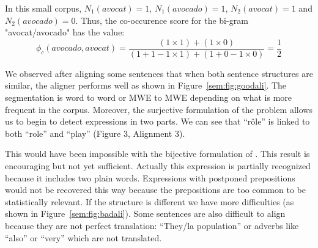 \documentclass[output=paper,modfonts,nonflat]{langsci/langscibook}
\begin{document}
In this small corpus, $N_1(avocat) = 1$, $N_1(avocado) = 1$, $N_2(avocat) = 1$ and $N_2(avocado) = 0$. Thus, the co-occurence score for the bi-gram "avocat/avocado" has the value:
\begin{equation}
\phi_{c}(avocado,avocat) = \frac{(1 \times 1) + (1 \times 0)}{(1 + 1 -1 \times 1) + (1 + 0 - 1 \times 0)} = \frac{1}{2}
\end{equation}

We observed after aligning some sentences that when both sentence structures are similar, the aligner performs well as shown in Figure~\ref{sem:fig:goodali}. The segmentation is word to word or MWE to MWE depending on what is more frequent in the corpus. Moreover, the surjective formulation of the problem allows us to begin to detect expressions in two parts. 
We can see that ``rôle'' is linked to both ``role'' and ``play'' (Figure 3, Alignment 3).

This would have been impossible with the bijective formulation of \citet{denero2008complexity}. This result is encouraging but not yet sufficient. 
Actually this expression is partially recognized because it includes two plain words. 
Expressions with postponed prepositions would not be recovered this way because the prepositions are too common to be statistically relevant.
If the structure is different we have more difficulties (as shown in Figure~\ref{sem:fig:badali}). 
Some sentences are also difficult to align because they are not perfect translation: 
``They/la population'' or adverbs like ``also'' or ``very'' which are not translated.
\end{document}
